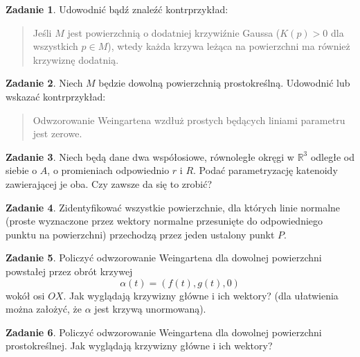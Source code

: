 \documentclass[a4paper,11pt]{article}
\theoremstyle{definition}\newtheorem{exercise}{Zadanie}
\theoremstyle{definition}\newtheorem{remark}{Uwaga}
\begin{document}
\begin{exercise}
Udowodnić bądź znaleźć kontrprzykład:
\begin{quote}
Jeśli $M$ jest powierzchnią o dodatniej krzywiźnie Gaussa ($K(p)>0$ dla 
wszystkich $p\in M$), wtedy każda krzywa leżąca na powierzchni ma również 
krzywiznę dodatnią.
\end{quote}

\end{exercise}



\begin{exercise}
Niech $M$ będzie dowolną powierzchnią prostokreślną. Udowodnić lub wskazać 
kontrprzykład: 
\begin{quote}
Odwzorowanie Weingartena wzdłuż prostych będących liniami parametru jest 
zerowe. 
\end{quote}

\end{exercise}






\begin{exercise}
Niech będą dane dwa współosiowe, równoległe okręgi w $\mathbb{R}^3$ odległe od siebie o $A$, o promieniach odpowiednio $r$ i $R$. Podać parametryzację katenoidy zawierającej je oba. Czy zawsze da się to zrobić?
\end{exercise}


\begin{exercise}
Zidentyfikować wszystkie powierzchnie, dla których linie normalne (proste 
wyznaczone przez wektory normalne przesunięte do odpowiedniego punktu na 
powierzchni) przechodzą przez jeden ustalony punkt $P$.
\end{exercise}

\begin{exercise}
Policzyć odwzorowanie Weingartena dla dowolnej powierzchni powstałej przez obrót krzywej \[\alpha(t)=(f(t),g(t),0)\] wokół osi $OX$. Jak wyglądają krzywizny główne i ich wektory? (dla ułatwienia można założyć, że $\alpha$ jest krzywą unormowaną).
\end{exercise}

\begin{exercise}
Policzyć odwzorowanie Weingartena dla dowolnej powierzchni prostokreślnej. Jak wyglądają krzywizny główne i ich wektory?
\end{exercise}
\end{document}
